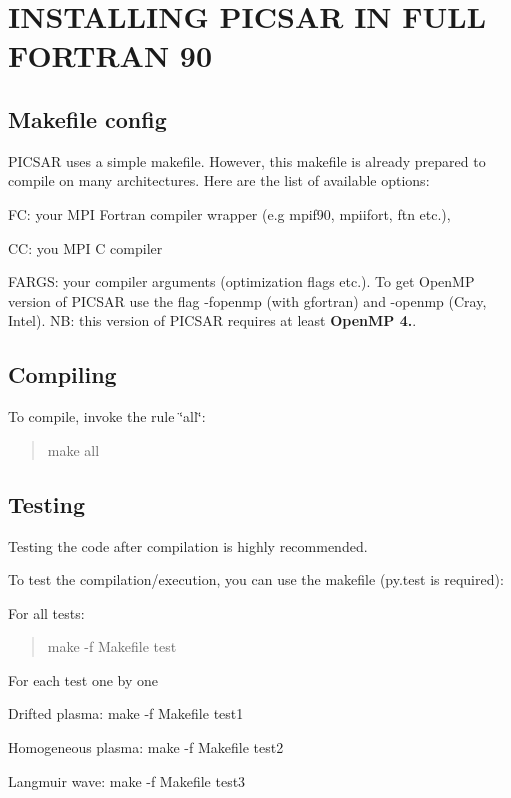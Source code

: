 \section*{I\+N\+S\+T\+A\+L\+L\+I\+NG P\+I\+C\+S\+AR IN F\+U\+LL F\+O\+R\+T\+R\+AN 90 }

\subsection*{Makefile config }

P\+I\+C\+S\+AR uses a simple makefile. However, this makefile is already prepared to compile on many architectures. Here are the list of available options\+:


\begin{DoxyItemize}
\item FC\+: your M\+PI Fortran compiler wrapper (e.\+g mpif90, mpiifort, ftn etc.),
\item CC\+: you M\+PI C compiler
\item F\+A\+R\+GS\+: your compiler arguments (optimization flags etc.). To get Open\+MP version of P\+I\+C\+S\+AR use the flag -\/fopenmp (with gfortran) and -\/openmp (Cray, Intel). NB\+: this version of P\+I\+C\+S\+AR requires at least {\bfseries Open\+MP 4.}.
\end{DoxyItemize}

\subsection*{Compiling }

To compile, invoke the rule \char`\"{}all\char`\"{}\+:

\begin{quote}
make all \end{quote}


\subsection*{Testing }

Testing the code after compilation is highly recommended.

To test the compilation/execution, you can use the makefile (py.\+test is required)\+:

For all tests\+: \begin{quote}
make -\/f Makefile test \end{quote}


For each test one by one
\begin{DoxyItemize}
\item Drifted plasma\+: make -\/f Makefile test1
\item Homogeneous plasma\+: make -\/f Makefile test2
\item Langmuir wave\+: make -\/f Makefile test3
\end{DoxyItemize}

